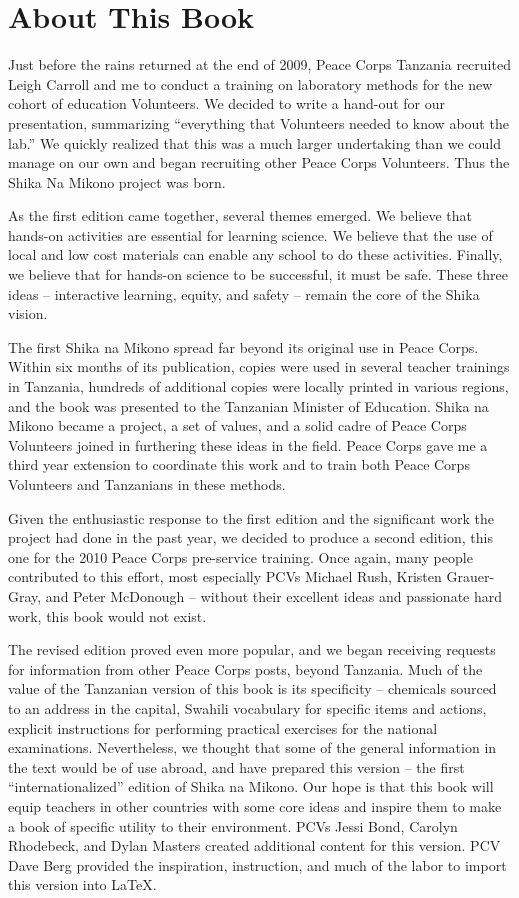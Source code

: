 \chapter{About This Book}

Just before the rains returned at the end of 2009, 
Peace Corps Tanzania recruited Leigh Carroll and me 
to conduct a training on laboratory methods 
for the new cohort of education Volunteers. 
We decided to write a hand-out for our presentation, 
summarizing “everything that Volunteers needed to know about the lab.” 
We quickly realized that this was a much larger undertaking 
than we could manage on our own 
and began recruiting other Peace Corps Volunteers. 
Thus the Shika Na Mikono project was born.

As the first edition came together, several themes emerged. 
We believe that hands-on activities are essential for learning science. 
We believe that the use of local and low cost materials 
can enable any school to do these activities. 
Finally, we believe that for hands-on science to be successful, 
it must be safe. 
These three ideas – interactive learning, equity, and safety – 
remain the core of the Shika vision.

The first Shika na Mikono spread far beyond 
its original use in Peace Corps. 
Within six months of its publication, 
copies were used in several teacher trainings in Tanzania, 
hundreds of additional copies were locally printed in various regions, 
and the book was presented to the Tanzanian Minister of Education. 
Shika na Mikono became a project, a set of values, 
and a solid cadre of Peace Corps Volunteers 
joined in furthering these ideas in the field. 
Peace Corps gave me a third year extension to 
coordinate this work and to train both Peace Corps Volunteers 
and Tanzanians in these methods.

Given the enthusiastic response to the first edition 
and the significant work the project had done in the past year, 
we decided to produce a second edition, 
this one for the 2010 Peace Corps pre-service training. 
Once again, many people contributed to this effort, 
most especially PCVs Michael Rush, Kristen Grauer-Gray, and Peter McDonough 
– without their excellent ideas and passionate hard work, 
this book would not exist.

The revised edition proved even more popular, 
and we began receiving requests for information 
from other Peace Corps posts, beyond Tanzania. 
Much of the value of the Tanzanian version of this book 
is its specificity – 
chemicals sourced to an address in the capital, 
Swahili vocabulary for specific items and actions, 
explicit instructions for performing practical exercises 
for the national examinations. 
Nevertheless, we thought that some of the general information 
in the text would be of use abroad, 
and have prepared this version – 
the first “internationalized” edition of Shika na Mikono. 
Our hope is that this book will equip teachers in other countries 
with some core ideas and inspire them to make 
a book of specific utility to their environment. 
PCVs Jessi Bond, Carolyn Rhodebeck, and Dylan Masters 
created additional content for this version. 
PCV Dave Berg provided the inspiration, instruction, 
and much of the labor to import this version into LaTeX.

